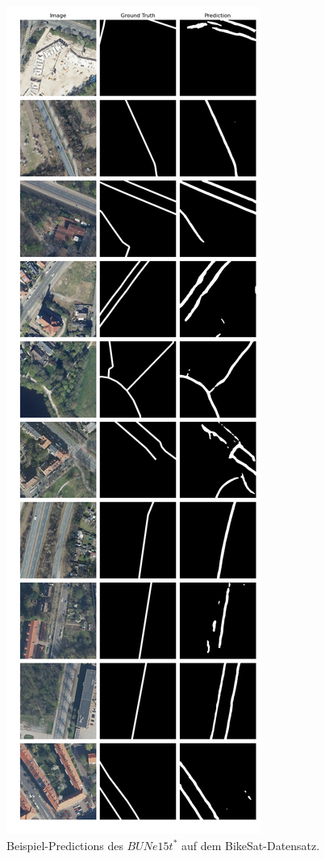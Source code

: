 \begin{figure}
	\centering
	\includegraphics[width=.41\textwidth]{Bilder/Samples-BikeSat/bunet15-s.png} 
	\caption{Beispiel-Predictions des $BUNe15t^*$ auf dem BikeSat-Datensatz.}
	\label{fig:bikesat-samples-bunet15-s}
\end{figure}

